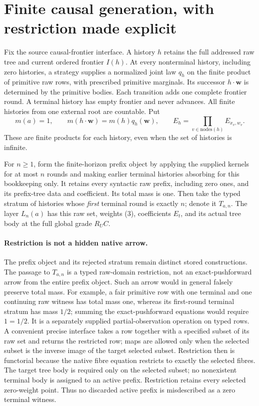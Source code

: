 \documentclass[11pt]{article}
\begin{document}
\section{Finite causal generation, with restriction made explicit}
Fix the source causal-frontier interface. A history $h$ retains the full addressed raw tree and current ordered frontier $I(h)$. At every nonterminal history, including zero histories, a strategy supplies a normalized joint law $q_h$ on the finite product of primitive raw rows, with prescribed primitive marginals. Its successor $h\cdot\mathbf w$ is determined by the primitive bodies. Each transition adds one complete frontier round. A terminal history has empty frontier and never advances. All finite histories from one external root are countable. Put
\[
 m(a)=1,\qquad m(h\cdot\mathbf w)=m(h)q_h(\mathbf w),\qquad
 E_h=\prod_{v\in\mathrm{nodes}(h)}E_{x_v,w_v}.              \tag{3}
\]
These are finite products for each history, even when the set of histories is infinite.

For $n\geq1$, form the finite-horizon prefix object by applying the supplied kernels for at most $n$ rounds and making earlier terminal histories absorbing for this bookkeeping only. It retains every syntactic raw prefix, including zero ones, and its prefix-tree data and coefficient. Its total mass is one. Then take the typed stratum of histories whose \emph{first} terminal round is exactly $n$; denote it $T_{a,n}$. The layer $L_n(a)$ has this raw set, weights (3), coefficients $E_t$, and its actual tree body at the full global grade $R_UC$.

\paragraph{Restriction is not a hidden native arrow.}
The prefix object and its rejected stratum remain distinct stored constructions. The passage to $T_{a,n}$ is a typed raw-domain restriction, not an exact-pushforward arrow from the entire prefix object. Such an arrow would in general falsely preserve total mass. For example, a fair primitive row with one terminal and one continuing raw witness has total mass one, whereas its first-round terminal stratum has mass $1/2$; summing the exact-pushforward equations would require $1=1/2$. It is a separately supplied partial-observation operation on typed rows. A convenient precise interface takes a row together with a specified subset of its raw set and returns the restricted row; maps are allowed only when the selected subset is the inverse image of the target selected subset. Restriction then is functorial because the native fibre equation restricts to exactly the selected fibres. The target tree body is required only on the selected subset; no nonexistent terminal body is assigned to an active prefix. Restriction retains every selected zero-weight point. Thus no discarded active prefix is misdescribed as a zero terminal witness.
\end{document}
